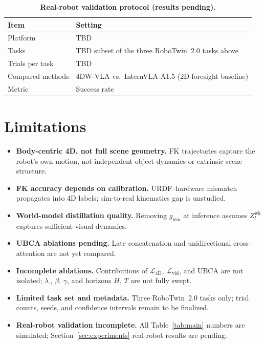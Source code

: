 \begin{table}[t]
\centering
\caption{\textbf{Real-robot validation protocol (results pending).}}
\label{tab:realrobot}
\small
\begin{tabularx}{\linewidth}{@{}lX@{}}
\toprule[1.5pt]
Item & Setting \\
\midrule
Platform & TBD \\
Tasks & TBD subset of the three RoboTwin~2.0 tasks above \\
Trials per task & TBD \\
Compared methods & 4DW-VLA vs.\ InternVLA-A1.5 (2D-foresight baseline) \\
Metric & Success rate \\
\bottomrule[1.5pt]
\end{tabularx}
\end{table}

\section{Limitations}
\label{sec:limitations}

\begin{itemize}
\item \textbf{Body-centric 4D, not full scene geometry.} FK trajectories capture the robot's own motion, not independent object dynamics or extrinsic scene structure.
\item \textbf{FK accuracy depends on calibration.} URDF--hardware mismatch propagates into 4D labels; sim-to-real kinematics gap is unstudied.
\item \textbf{World-model distillation quality.} Removing $g_{\mathrm{wm}}$ at inference assumes $Z^{\mathrm{wk}}_t$ captures sufficient visual dynamics.
\item \textbf{UBCA ablations pending.} Late concatenation and unidirectional cross-attention are not yet compared.
\item \textbf{Incomplete ablations.} Contributions of $\mathcal{L}_{\mathrm{4D}}$, $\mathcal{L}_{\mathrm{vid}}$, and UBCA are not isolated; $\lambda_{\cdot}$, $\beta$, $\gamma$, and horizons $H$, $T$ are not fully swept.
\item \textbf{Limited task set and metadata.} Three RoboTwin~2.0 tasks only; trial counts, seeds, and confidence intervals remain to be finalized.
\item \textbf{Real-robot validation incomplete.} All Table~\ref{tab:main} numbers are simulated; Section~\ref{sec:experiments} real-robot results are pending.
\end{itemize}

